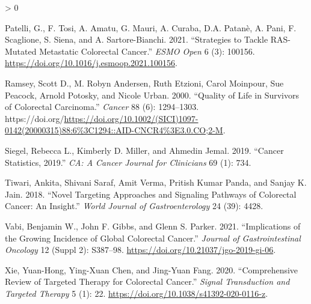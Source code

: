 \documentclass[
]{article}
\newlength{\cslhangindent}
\newenvironment{CSLReferences}[2] %
 {%
  \setlength{\parindent}{0pt}
  \ifodd #1 \everypar{\setlength{\hangindent}{\cslhangindent}}\ignorespaces\fi
  \ifnum #2 > 0
  \setlength{\parskip}{#2\baselineskip}
  \fi
 }%
 {}
\begin{document}
\begin{CSLReferences}{1}{0}
\leavevmode\hypertarget{ref-patelli2021}{}%
Patelli, G., F. Tosi, A. Amatu, G. Mauri, A. Curaba, D.A. Patanè, A.
Pani, F. Scaglione, S. Siena, and A. Sartore-Bianchi. 2021.
{``Strategies to Tackle RAS-Mutated Metastatic Colorectal Cancer.''}
\emph{ESMO Open} 6 (3): 100156.
\url{https://doi.org/10.1016/j.esmoop.2021.100156}.

\leavevmode\hypertarget{ref-ramsey2000}{}%
Ramsey, Scott D., M. Robyn Andersen, Ruth Etzioni, Carol Moinpour, Sue
Peacock, Arnold Potosky, and Nicole Urban. 2000. {``Quality of Life in
Survivors of Colorectal Carcinoma.''} \emph{Cancer} 88 (6): 1294--1303.
https://doi.org/\url{https://doi.org/10.1002/(SICI)1097-0142(20000315)88:6\%3C1294::AID-CNCR4\%3E3.0.CO;2-M}.

\leavevmode\hypertarget{ref-siegel2019}{}%
Siegel, Rebecca L., Kimberly D. Miller, and Ahmedin Jemal. 2019.
{``Cancer Statistics, 2019.''} \emph{CA: A Cancer Journal for
Clinicians} 69 (1): 734.

\leavevmode\hypertarget{ref-tiwari2018}{}%
Tiwari, Ankita, Shivani Saraf, Amit Verma, Pritish Kumar Panda, and
Sanjay K. Jain. 2018. {``Novel Targeting Approaches and Signaling
Pathways of Colorectal Cancer: An Insight.''} \emph{World Journal of
Gastroenterology} 24 (39): 4428.

\leavevmode\hypertarget{ref-vabi2021}{}%
Vabi, Benjamin W., John F. Gibbs, and Glenn S. Parker. 2021.
{``Implications of the Growing Incidence of Global Colorectal Cancer.''}
\emph{Journal of Gastrointestinal Oncology} 12 (Suppl 2): S387--98.
\url{https://doi.org/10.21037/jgo-2019-gi-06}.

\leavevmode\hypertarget{ref-xie2020}{}%
Xie, Yuan-Hong, Ying-Xuan Chen, and Jing-Yuan Fang. 2020.
{``Comprehensive Review of Targeted Therapy for Colorectal Cancer.''}
\emph{Signal Transduction and Targeted Therapy} 5 (1): 22.
\url{https://doi.org/10.1038/s41392-020-0116-z}.

\end{CSLReferences}
\end{document}
